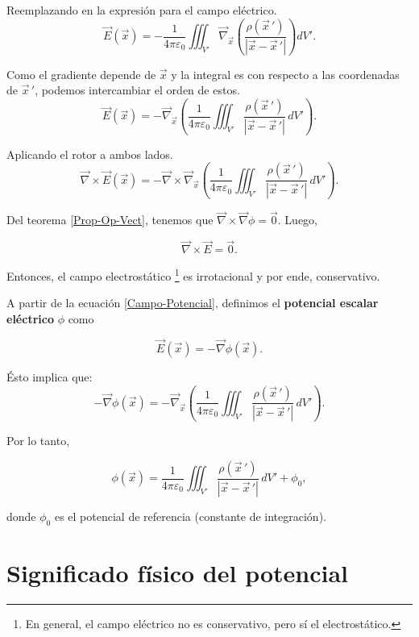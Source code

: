 Reemplazando en la expresión para el campo eléctrico.
$$\Vec{E}(\vec{x}) = - \frac{1}{4\pi \varepsilon_0} \iiint_{V'} \vec{\nabla}_{\vec{x}} \left( \frac{\rho(\vec{x}\,')}{|\vec{x} - \vec{x}\,'|} \right) dV'.$$

Como el gradiente depende de $\vec{x}$ y la integral es con respecto a las coordenadas de  $\vec{x}\,'$, podemos intercambiar el orden de estos.
\begin{equation}
\vec{E}(\Vec{x}) = - \vec{\nabla}_{\vec{x}} \left( \frac{1}{4\pi \varepsilon_0} \iiint_{V'} \frac{\rho(\vec{x}\,')}{|\vec{x} - \vec{x}\,'|} \,dV' \right). \label{Campo-Potencial}
\end{equation}

Aplicando el rotor a ambos lados.
$$\Vec{\nabla} \times \vec{E}(\Vec{x}) = - \Vec{\nabla} \times \vec{\nabla}_{\vec{x}} \left( \frac{1}{4\pi \varepsilon_0} \iiint_{V'} \frac{\rho(\vec{x}\,')}{|\vec{x} - \vec{x}\,'|} \,dV' \right).$$

Del teorema \ref{Prop-Op-Vect}, tenemos que $\Vec{\nabla} \times \Vec{\nabla} \phi = \Vec{0}$. Luego,
\begin{shaded}
$$\vec{\nabla} \times \vec{E} = \vec{0}.$$
\end{shaded}

Entonces, el campo electrostático \footnote{En general, el campo eléctrico no es conservativo, pero sí el electrostático.} es irrotacional y por ende, conservativo.

A partir de la ecuación \eqref{Campo-Potencial}, definimos el \textbf{potencial escalar eléctrico} $\phi$ como
\begin{shaded}
\begin{equation}
\vec{E}(\vec{x}) = - \vec{\nabla} \phi(\vec{x}). \label{Relacion-Campo-Potencial}
\end{equation}
\end{shaded}

Ésto implica que:
$$- \vec{\nabla}\phi(\vec{x}) = - \vec{\nabla}_{\vec{x}} \left( \frac{1}{4\pi \varepsilon_0} \iiint_{V'} \frac{\rho(\vec{x}\,')}{|\vec{x} - \vec{x}\,'|} \,dV' \right).$$


Por lo tanto,
\begin{shaded}
    $$\phi(\vec{x}) =  \frac{1}{4\pi \varepsilon_0} \iiint_{V'} \frac{\rho(\vec{x}\,')}{|\vec{x} - \vec{x}\,'|} \,dV' + \phi_0,$$
\end{shaded}

donde $\phi_0$ es el potencial de referencia (constante de integración).

\section{Significado físico del potencial}

